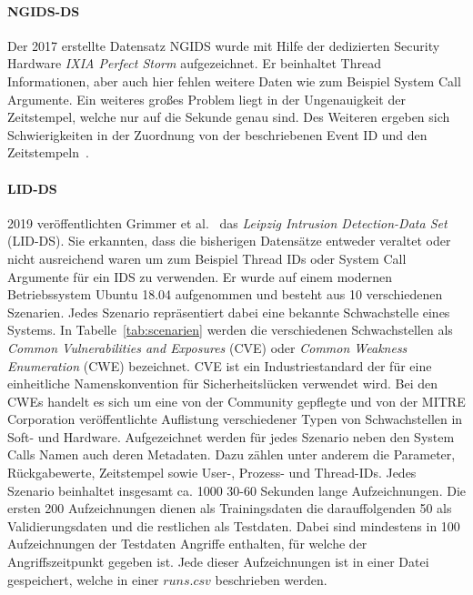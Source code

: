         \paragraph{NGIDS-DS}
            Der 2017 erstellte Datensatz NGIDS \cite{NGIDS} wurde mit Hilfe der dedizierten Security Hardware \textit{IXIA Perfect Storm} aufgezeichnet.
            Er beinhaltet Thread Informationen, aber auch hier fehlen weitere Daten wie zum Beispiel System Call Argumente.
            Ein weiteres großes Problem liegt in der Ungenauigkeit der Zeitstempel, welche nur auf die Sekunde genau sind.
            Des Weiteren ergeben sich Schwierigkeiten in der Zuordnung von der beschriebenen Event ID und den Zeitstempeln~\cite{Grimmer}.
        \paragraph{LID-DS}
            2019 veröffentlichten Grimmer et al.~\cite{LIDDS} das \textit{Leipzig Intrusion Detection-Data Set} (LID-DS).
            Sie erkannten, dass die bisherigen Datensätze entweder veraltet oder nicht ausreichend waren um zum Beispiel Thread IDs oder System Call Argumente für ein IDS zu verwenden.
            Er wurde auf einem modernen Betriebssystem Ubuntu 18.04 aufgenommen und besteht aus 10 verschiedenen Szenarien.
            Jedes Szenario repräsentiert dabei eine bekannte Schwachstelle eines Systems.
            In Tabelle~\ref{tab:scenarien} werden die verschiedenen Schwachstellen als \textit{Common Vulnerabilities and Exposures} (CVE)
             oder \textit{Common Weakness Enumeration} (CWE)  bezeichnet.
            CVE ist ein Industriestandard der für eine einheitliche Namenskonvention für Sicherheitslücken verwendet wird.
            Bei den CWEs handelt es sich um eine von der Community gepflegte und von der MITRE Corporation veröffentlichte Auflistung verschiedener Typen von Schwachstellen in Soft- und Hardware.
            Aufgezeichnet werden für jedes Szenario neben den System Calls Namen auch deren Metadaten.
            Dazu zählen unter anderem die Parameter, Rückgabewerte, Zeitstempel sowie User-, Prozess- und Thread-IDs.
            Jedes Szenario beinhaltet insgesamt ca. 1000 30-60 Sekunden lange Aufzeichnungen.
            Die ersten 200 Aufzeichnungen dienen als Trainingsdaten die darauffolgenden 50 als Validierungsdaten und die restlichen als Testdaten. 
            Dabei sind mindestens in 100 Aufzeichnungen der Testdaten Angriffe enthalten, für welche der Angriffszeitpunkt gegeben ist.
            Jede dieser Aufzeichnungen ist in einer Datei gespeichert, welche in einer $runs.csv$ beschrieben werden.
             
